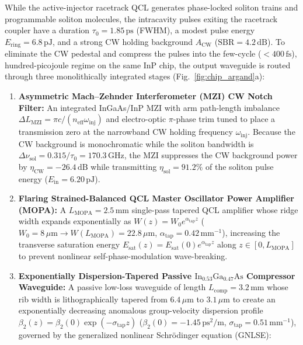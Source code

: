 \documentclass[11pt,letterpaper]{article}
\begin{document}
While the active-injector racetrack QCL generates phase-locked soliton trains and programmable soliton molecules, the intracavity pulses exiting the racetrack coupler have a duration $\tau_0 = 1.85\,\mathrm{ps}$ (FWHM), a modest pulse energy $E_{\mathrm{ring}} = 6.8\,\mathrm{pJ}$, and a strong CW holding background $A_{\mathrm{CW}}$ ($\mathrm{SBR} = 4.2\,\mathrm{dB}$). To eliminate the CW pedestal and compress the pulses into the few-cycle ($<400\,\mathrm{fs}$), hundred-picojoule regime on the same InP chip, the output waveguide is routed through three monolithically integrated stages (Fig.~\ref{fig:chip_argand}a):
\begin{enumerate}
    \item \textbf{Asymmetric Mach--Zehnder Interferometer (MZI) CW Notch Filter:} An integrated InGaAs/InP MZI with arm path-length imbalance $\Delta L_{\mathrm{MZI}} = \pi c / (n_{\mathrm{eff}}\omega_{\mathrm{inj}})$ and electro-optic $\pi$-phase trim tuned to place a transmission zero at the narrowband CW holding frequency $\omega_{\mathrm{inj}}$. Because the CW background is monochromatic while the soliton bandwidth is $\Delta\nu_{\mathrm{sol}} = 0.315/\tau_0 = 170.3\,\mathrm{GHz}$, the MZI suppresses the CW background power by $\eta_{\mathrm{CW}} = -26.4\,\mathrm{dB}$ while transmitting $\eta_{\mathrm{sol}} = 91.2\%$ of the soliton pulse energy ($E_{\mathrm{in}} = 6.20\,\mathrm{pJ}$).
    \item \textbf{Flaring Strained-Balanced QCL Master Oscillator Power Amplifier (MOPA):} A $L_{\mathrm{MOPA}} = 2.5\,\mathrm{mm}$ single-pass tapered QCL amplifier whose ridge width expands exponentially as $W(z) = W_0 e^{\alpha_{\mathrm{tap}} z}$ ($W_0 = 8\,\mu\mathrm{m} \to W(L_{\mathrm{MOPA}}) = 22.8\,\mu\mathrm{m}$, $\alpha_{\mathrm{tap}} = 0.42\,\mathrm{mm}^{-1}$), increasing the transverse saturation energy $E_{\mathrm{sat}}(z) = E_{\mathrm{sat}}(0)e^{\alpha_{\mathrm{tap}} z}$ along $z \in [0, L_{\mathrm{MOPA}}]$ to prevent nonlinear self-phase-modulation wave-breaking.
    \item \textbf{Exponentially Dispersion-Tapered Passive $\mathrm{In}_{0.53}\mathrm{Ga}_{0.47}\mathrm{As}$ Compressor Waveguide:} A passive low-loss waveguide of length $L_{\mathrm{comp}} = 3.2\,\mathrm{mm}$ whose rib width is lithographically tapered from $6.4\,\mu\mathrm{m}$ to $3.1\,\mu\mathrm{m}$ to create an exponentially decreasing anomalous group-velocity dispersion profile $\beta_2(z) = \beta_2(0)\exp(-\sigma_{\mathrm{tap}} z)$ ($\beta_2(0) = -1.45\,\mathrm{ps^2/m}$, $\sigma_{\mathrm{tap}} = 0.51\,\mathrm{mm}^{-1}$), governed by the generalized nonlinear Schr\"odinger equation (GNLSE):

\end{enumerate}
\end{document}
